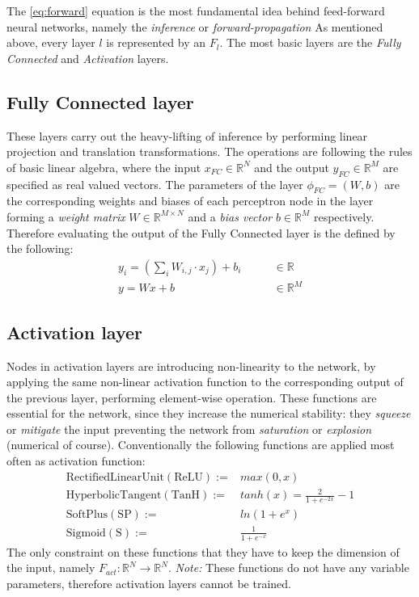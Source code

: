 The \ref{eq:forward} equation is the most fundamental idea behind feed-forward neural networks, namely the \emph{inference} or \emph{forward-propagation}
As mentioned above, every layer $l$ is represented by an $F_l$. 
The most basic layers are the \emph{Fully Connected} and \emph{Activation} layers.

\subsection{Fully Connected layer} 
These layers carry out the heavy-lifting of inference by performing linear projection and translation transformations. 
The operations are following the rules of basic linear algebra, where the input $x_{FC} \in \mathbb{R}^N$ and the output $y_{FC} \in \mathbb{R}^M$ are specified as real valued vectors.
The parameters of the layer $\phi_{FC}=(W, b)$ are the corresponding weights and biases of each perceptron node in the layer forming a \emph{weight matrix} $W \in \mathbb{R}^{M \times N}$ and a \emph{bias vector} $b \in \mathbb{R}^M$ respectively.
Therefore evaluating the output of the Fully Connected layer is the defined by the following:
\begin{equation}\label{eq:FC}
\begin{split}
    y_i = \left(\sum_i W_{i,j} \cdot x_j \right) + b_i \qquad &\in \mathbb{R}\\
    y = Wx + b \qquad &\in \mathbb{R}^M
\end{split}
\end{equation}
\subsection{Activation layer} 
Nodes in activation layers are introducing non-linearity to the network, by applying the same non-linear activation function to the corresponding output of the previous layer, performing element-wise operation.
These functions are essential for the network, since they increase the numerical stability: they \emph{squeeze} or \emph{mitigate} the input preventing the network from \emph{saturation} or \emph{explosion} (numerical of course). Conventionally the following functions are applied most often as activation function:
\begin{align*}
    \mathrm{Rectified Linear Unit (ReLU) := } &max(0, x) \\
    \mathrm{Hyperbolic Tangent (TanH) := }   &tanh(x) = \frac{2}{1+e^{-2x}}-1 \\
    \mathrm{SoftPlus (SP) := }   &ln(1+e^x) \\
    \mathrm{Sigmoid (S) := }  &\frac{1}{1+e^{-x}}
\end{align*}
The only constraint on these functions that they have to keep the dimension of the input, namely $F_{act}:\mathbb{R}^N \rightarrow \mathbb{R}^N$.
\emph{Note:} These functions do not have any variable parameters, therefore activation layers cannot be trained.

